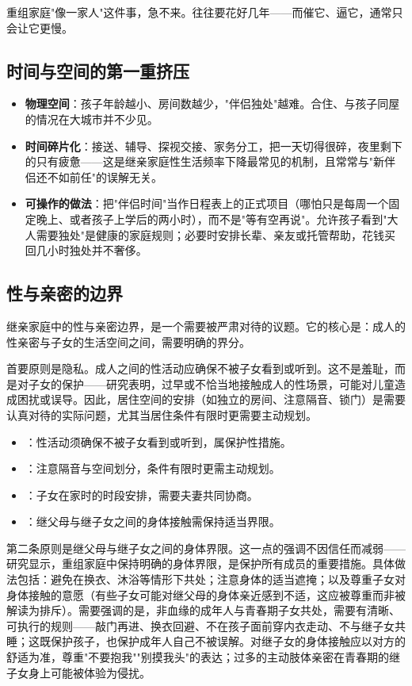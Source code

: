\begin{tcolorbox}[colback=pink!5!white,colframe=red!50!black,title=贴心小叮咛]
重组家庭"像一家人"这件事，急不来。往往要花好几年——而催它、逼它，通常只会让它更慢。
\end{tcolorbox}
\subsection{时间与空间的第一重挤压}

\begin{itemize}
  \item \textbf{物理空间}：孩子年龄越小、房间数越少，"伴侣独处"越难。合住、与孩子同屋的情况在大城市并不少见。
  \item \textbf{时间碎片化}：接送、辅导、探视交接、家务分工，把一天切得很碎，夜里剩下的只有疲惫——这是继亲家庭性生活频率下降最常见的机制，且常常与"新伴侣还不如前任"的误解无关。
  \item \textbf{可操作的做法}：把"伴侣时间"当作日程表上的正式项目（哪怕只是每周一个固定晚上、或者孩子上学后的两小时），而不是"等有空再说"。允许孩子看到"大人需要独处"是健康的家庭规则；必要时安排长辈、亲友或托管帮助，花钱买回几小时独处并不奢侈。
\end{itemize}

\subsection{性与亲密的边界}

继亲家庭中的性与亲密边界，是一个需要被严肃对待的议题。它的核心是：成人的性亲密与子女的生活空间之间，需要明确的界分。

首要原则是隐私。成人之间的性活动应确保不被子女看到或听到。这不是羞耻，而是对子女的保护——研究表明，过早或不恰当地接触成人的性场景，可能对儿童造成困扰或误导。因此，居住空间的安排（如独立的房间、注意隔音、锁门）是需要认真对待的实际问题，尤其当居住条件有限时更需要主动规划。

\begin{itemize}
  \item {}：性活动须确保不被子女看到或听到，属保护性措施。
  \item {}：注意隔音与空间划分，条件有限时更需主动规划。
  \item {}：子女在家时的时段安排，需要夫妻共同协商。
  \item {}：继父母与继子女之间的身体接触需保持适当界限。
\end{itemize}

第二条原则是继父母与继子女之间的身体界限。这一点的强调不因信任而减弱——研究显示，重组家庭中保持明确的身体界限，是保护所有成员的重要措施。具体做法包括：避免在换衣、沐浴等情形下共处；注意身体的适当遮掩；以及尊重子女对身体接触的意愿（有些子女可能对继父母的身体亲近感到不适，这应被尊重而非被解读为排斥）。需要强调的是，非血缘的成年人与青春期子女共处，需要有清晰、可执行的规则——敲门再进、换衣回避、不在孩子面前穿内衣走动、不与继子女共睡；这既保护孩子，也保护成年人自己不被误解。对继子女的身体接触应以对方的舒适为准，尊重"不要抱我""别摸我头"的表达；过多的主动肢体亲密在青春期的继子女身上可能被体验为侵扰。

